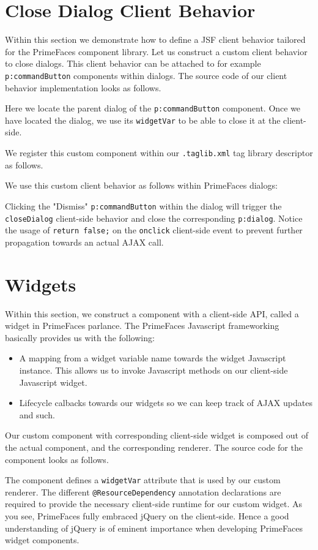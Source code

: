 \section{Close Dialog Client Behavior}
Within this section we demonstrate how to define a JSF client behavior tailored for the PrimeFaces component library.
Let us construct a custom client behavior to close dialogs.
This client behavior can be attached to for example \texttt{p:commandButton} components within dialogs.
The source code of our client behavior implementation looks as follows.

Here we locate the parent dialog of the \texttt{p:commandButton} component.
Once we have located the dialog, we use its \texttt{widgetVar} to be able to close it at the client-side.

We register this custom component within our \texttt{.taglib.xml} tag library descriptor as follows.


We use this custom client behavior as follows within PrimeFaces dialogs:

Clicking the "Dismiss" \texttt{p:commandButton} within the dialog will trigger the \texttt{closeDialog} client-side behavior and close the corresponding \texttt{p:dialog}.
Notice the usage of \texttt{return false;} on the \texttt{onclick} client-side event to prevent further propagation towards an actual AJAX call.

\section{Widgets}
Within this section, we construct a component with a client-side API, called a widget in PrimeFaces parlance.
The PrimeFaces Javascript frameworking basically provides us with the following:
\begin{itemize}
	\item A mapping from a widget variable name towards the widget Javascript instance.
	This allows us to invoke Javascript methods on our client-side Javascript widget.
	\item Lifecycle calbacks towards our widgets so we can keep track of AJAX updates and such.
\end{itemize}
Our custom component with corresponding client-side widget is composed out of the actual component, and the corresponding renderer.
The source code for the component looks as follows.

The component defines a \texttt{widgetVar} attribute that is used by our custom renderer.
The different \texttt{@ResourceDependency} annotation declarations are required to provide the necessary client-side runtime for our custom widget.
As you see, PrimeFaces fully embraced jQuery \cite{jQuery} on the client-side.
Hence a good understanding of jQuery is of eminent importance when developing PrimeFaces widget components.


